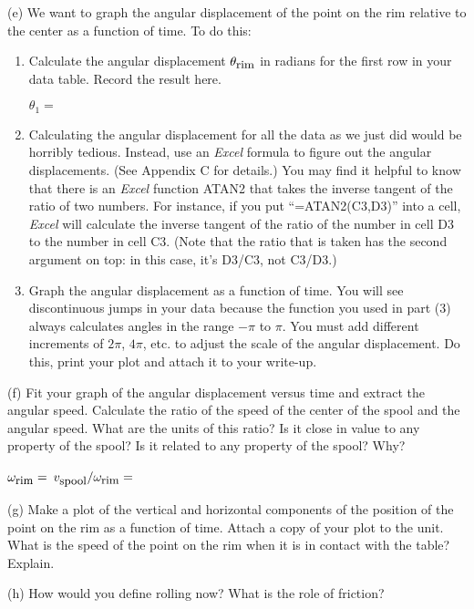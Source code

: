 (e) We want to graph the angular displacement of the point on the rim relative
to the center as a function of time. To do this:

\begin{enumerate}
\item Calculate the angular displacement \( \theta _{\mbox{\small rim}} \) in radians for the first
row in your data table. Record the result here.

$\theta _{1}=$

\item Calculating the angular displacement for all the data as we just did
would be horribly tedious. Instead, use an {\it Excel} formula to
figure out the angular displacements.  (See Appendix C for details.)
You may find it helpful to know that there is an {\it Excel} function
ATAN2 that takes the inverse tangent of the ratio of two numbers.
For instance, if you put ``=ATAN2(C3,D3)'' into a cell, {\it Excel}
will calculate the inverse tangent of the ratio of the number
in cell D3 to the number in cell C3.  (Note that the ratio
that is taken has the second argument on top: in this case, it's 
D3/C3, not C3/D3.)


\item Graph the angular displacement as a function of time.
You will see discontinuous jumps in your data because the function you used
in part (3) always calculates angles in the range \( -\pi  \) to \( \pi  \).
You must add different increments of \( 2\pi  \), \( 4\pi  \), etc. to adjust
the scale of the angular displacement. Do this, print your plot and attach it
to your write-up. 
\end{enumerate}
(f) Fit your graph of the angular displacement versus time and extract the angular
speed. Calculate the ratio of the speed of the center of the spool and the angular
speed. What are the units of this ratio? Is it close in value to any property
of the spool? Is it related to any property of the spool? Why?
\vspace{5mm}

\( \omega _{\mbox{\small rim}}= \)\hfill{} \( v_{\mbox{\small spool}}/
\omega _{\mbox{\small rim}}= \)\hfill{}
\vspace{10mm}

(g) Make a plot of the vertical and horizontal components of the position of
the point on the rim as a function of time. Attach a copy of your plot to the
unit. What is the speed of the point on the rim when it is in contact with the
table? Explain.
\vspace{20mm}

(h) How would you define rolling now? What is the role of friction?

